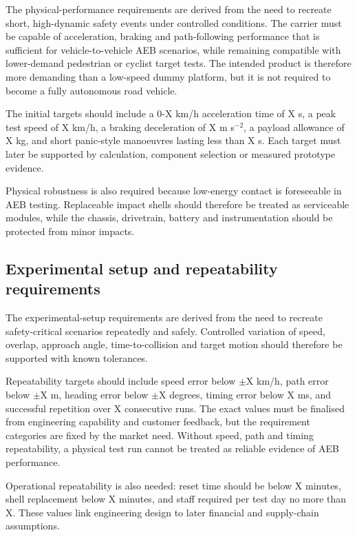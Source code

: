 The physical-performance requirements are derived from the need to recreate short, high-dynamic safety events under controlled conditions. The carrier must be capable of acceleration, braking and path-following performance that is sufficient for vehicle-to-vehicle AEB scenarios, while remaining compatible with lower-demand pedestrian or cyclist target tests. The intended product is therefore more demanding than a low-speed dummy platform, but it is not required to become a fully autonomous road vehicle.

The initial targets should include a 0-X km/h acceleration time of X s, a peak test speed of X km/h, a braking deceleration of X m s$^{-2}$, a payload allowance of X kg, and short panic-style manoeuvres lasting less than X s. Each target must later be supported by calculation, component selection or measured prototype evidence.

Physical robustness is also required because low-energy contact is foreseeable in AEB testing. Replaceable impact shells should therefore be treated as serviceable modules, while the chassis, drivetrain, battery and instrumentation should be protected from minor impacts.

\subsection{Experimental setup and repeatability requirements}
\label{sec:ch8_experimental_repeatability_requirements}

The experimental-setup requirements are derived from the need to recreate safety-critical scenarios repeatedly and safely. Controlled variation of speed, overlap, approach angle, time-to-collision and target motion should therefore be supported with known tolerances.

Repeatability targets should include speed error below $\pm$X km/h, path error below $\pm$X m, heading error below $\pm$X degrees, timing error below X ms, and successful repetition over X consecutive runs. The exact values must be finalised from engineering capability and customer feedback, but the requirement categories are fixed by the market need. Without speed, path and timing repeatability, a physical test run cannot be treated as reliable evidence of AEB performance.

Operational repeatability is also needed: reset time should be below X minutes, shell replacement below X minutes, and staff required per test day no more than X. These values link engineering design to later financial and supply-chain assumptions.


